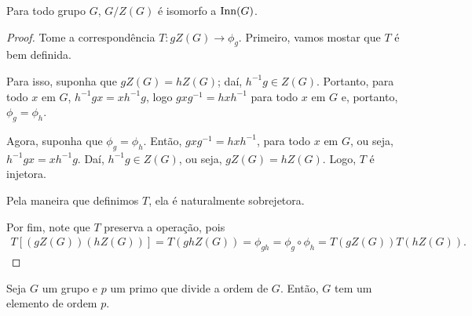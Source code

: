 	\begin{theorem}
		Para todo grupo $G$, $G/Z(G)$ é isomorfo a $\operatorname{Inn}(G)$.
	\end{theorem}
	
	\begin{proof}
		Tome a correspondência $T:gZ(G)\to \phi_g$. Primeiro, vamos mostar que $T$ é bem definida. 
		\par\vspace{0.3cm} Para isso, suponha que $gZ(G) = hZ(G)$; daí, $h^{-1}g\in Z(G)$. Portanto, para todo $x$ em $G$, $h^{-1}gx = xh^{-1}g$, logo $gxg^{-1} = hxh^{-1}$ para todo $x$ em $G$ e, portanto, $\phi_g = \phi_h$. 
		\par\vspace{0.3cm} Agora, suponha que $\phi_g = \phi_h$. Então, $gxg^{-1} = hxh^{-1}$, para todo $x$ em $G$, ou seja, $h^{-1}gx = xh^{-1}g$. Daí, $h^{-1}g\in Z(G)$, ou seja, $gZ(G) = hZ(G)$. Logo, $T$ é injetora.
		\par\vspace{0.3cm} Pela maneira que definimos $T$, ela é naturalmente sobrejetora. 
		\par\vspace{0.3cm} Por fim, note que $T$ preserva a operação, pois
		\begin{align*}
		T[(gZ(G))(hZ(G))] = T(ghZ(G)) = \phi_{gh} = \phi_g\circ\phi_h = T(gZ(G))T(hZ(G)).
		\end{align*}
	\end{proof}
	
	\begin{theorem}
		\label{cauchy}
		Seja $G$ um grupo e $p$ um primo que divide a ordem de $G$. Então, $G$ tem um elemento de ordem $p$.
	\end{theorem}
	
